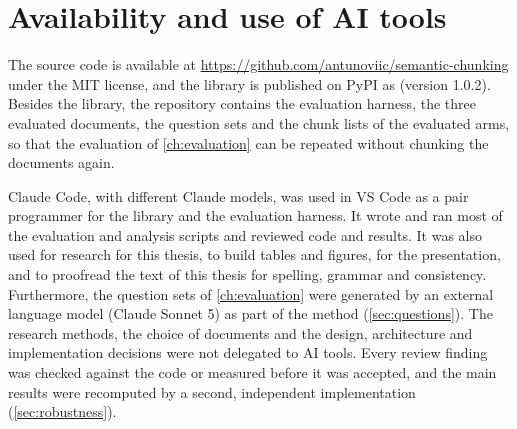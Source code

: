 \section{Availability and use of AI tools}
\label{sec:ai-usage}
\label{sec:availability}

The source code is available at \url{https://github.com/antunoviic/semantic-chunking}
under the MIT license, and the library is published on PyPI as \pkg{} (version 1.0.2).
Besides the library, the repository contains the evaluation harness, the three evaluated
documents, the question sets and the chunk lists of the evaluated arms, so that the
evaluation of \cref{ch:evaluation} can be repeated without chunking the documents again.

Claude Code, with different Claude models, was used in VS Code as a pair programmer for
the library and the evaluation harness. It wrote and ran most of the evaluation and
analysis scripts and reviewed code and results. It was also used for research for this
thesis, to build tables and figures, for the presentation, and to proofread the text of
this thesis for spelling, grammar and consistency. Furthermore, the question sets of
\cref{ch:evaluation} were generated by an external language model (Claude Sonnet 5) as
part of the method (\cref{sec:questions}). The research methods, the choice of documents
and the design, architecture and implementation decisions were not delegated to AI tools.
Every review finding was checked against the code or measured before it was accepted, and
the main results were recomputed by a second, independent implementation
(\cref{sec:robustness}).
